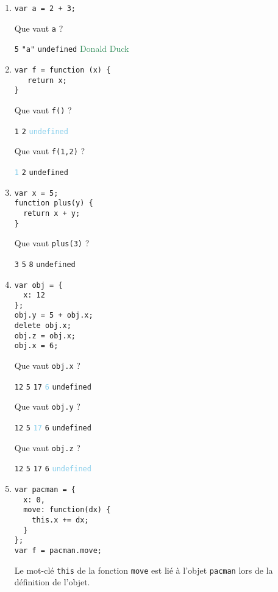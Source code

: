 \documentclass[a4paper, 12pt]{article}
\newcommand{\fullpoint}[1]{\textcolor{RubineRed}{#1}}
\newcommand{\halfpoint}[1]{\textcolor{SkyBlue}{#1}}
\newcommand{\jedipoint}[1]{\textcolor{SeaGreen}{#1}}
\newcommand{\choice}[1]{\Square\hspace{2pt} #1\hspace{5pt}}
\newcommand{\choicec}[1]{\Square\hspace{2pt} \lstinline{#1}\hspace{5pt}}
\newcommand{\choicecg}[1]{\fullpoint{\XBox\hspace{2pt} \lstinline{#1}\hspace{5pt}}}
\newcommand{\choicecgh}[1]{\halfpoint{\XBox\hspace{2pt} \lstinline{#1}\hspace{5pt}}}
\begin{document}
\begin{enumerate}
\item \lstset{language=javascript}
\begin{lstlisting}
var a = 2 + 3;
\end{lstlisting}

  Que vaut \lstinline{a} ?

  \choicecg{5} \choicec{"a"} \choicec{undefined} \jedipoint{\choice{Donald Duck}}
\item \lstset{language=javascript}
\begin{lstlisting}
var f = function (x) {
   return x;
}
\end{lstlisting}

   Que vaut \lstinline{f()} ?

   \choicec{1} \choicec{2} \choicecgh{undefined}

   Que vaut \lstinline{f(1,2)} ?

   \choicecgh{1} \choicec{2} \choicec{undefined}
\item \lstset{language=javascript}
\begin{lstlisting}
var x = 5;
function plus(y) {
  return x + y;
}
\end{lstlisting}

  Que vaut \lstinline{plus(3)} ?

  \choicec{3} \choicec{5} \choicecg{8} \choicec{undefined}
\item \lstset{language=javascript}
\begin{lstlisting}
var obj = {
  x: 12
};
obj.y = 5 + obj.x;
delete obj.x;
obj.z = obj.x;
obj.x = 6;
\end{lstlisting}

  Que vaut \lstinline{obj.x} ?

  \choicec{12} \choicec{5} \choicec{17} \choicecgh{6} \choicec{undefined}

  Que vaut \lstinline{obj.y} ?

  \choicec{12} \choicec{5} \choicecgh{17} \choicec{6} \choicec{undefined}

  Que vaut \lstinline{obj.z} ?

  \choicec{12} \choicec{5} \choicec{17} \choicec{6} \choicecgh{undefined}
\item \lstset{language=javascript}
\begin{lstlisting}
var pacman = {
  x: 0,
  move: function(dx) {
    this.x += dx;
  }
};
var f = pacman.move;
\end{lstlisting}

  Le mot-clé \lstinline{this} de la fonction \lstinline{move} est lié
  à l'objet \lstinline{pacman} lors de la définition de l'objet.


\end{enumerate}
\end{document}
